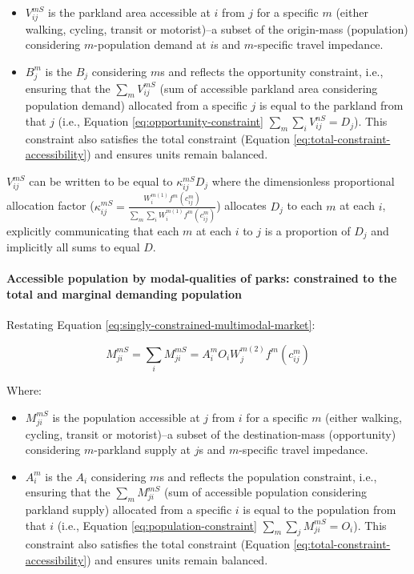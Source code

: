 \documentclass[
11pt, %
oneside, %
english, %
singlespacing, %
]{macthesis} %
\def\tightlist{}
\begin{document}
\begin{itemize}
\tightlist
\item
  \(V^{mS}_{ij}\) is the parkland area accessible at \(i\) from \(j\) for a specific \(m\) (either walking, cycling, transit or motorist)--a subset of the origin-mass (population) considering \(m\)-population demand at \(i\)s and \(m\)-specific travel impedance.
\item
  \(B_j^{m}\) is the \(B_j\) considering \(m\)s and reflects the opportunity constraint, i.e., ensuring that the \(\sum_m V^{mS}_{ij}\) (sum of accessible parkland area considering population demand) allocated from a specific \(j\) is equal to the parkland from that \(j\) (i.e., Equation \ref{eq:opportunity-constraint} \(\sum_m \sum_i V^{nS}_{ij} =  D_j\)). This constraint also satisfies the total constraint (Equation \ref{eq:total-constraint-accessibility}) and ensures units remain balanced.
\end{itemize}

\(V_{ij}^{mS}\) can be written to be equal to \(\kappa_{ij}^{mS} D_j\) where the dimensionless proportional allocation factor (\(\kappa_{ij}^{mS} = \frac{W_i^{m(1)} f^m(c^m_{ij})}{\sum_m\sum_i W_i^{m(1)} f^m(c^m_{ij})}\)) allocates \(D_j\) to each \(m\) at each \(i\), explicitly communicating that each \(m\) at each \(i\) to \(j\) is a proportion of \(D_j\) and implicitly all sums to equal \(D\).

\paragraph{Accessible population by modal-qualities of parks: constrained to the total and marginal demanding population}\label{accessible-population-by-modal-qualities-of-parks-constrained-to-the-total-and-marginal-demanding-population}

Restating Equation \ref{eq:singly-constrained-multimodal-market}:

\begin{equation}
\label{eq:singly-constrained-multimodal-market}
M^{mS}_{ji} = \sum_i M^{mS}_{ji} = A_i^{m} O_i W_j^{m(2)} f^m(c^m_{ij})
\end{equation} 

Where:

\begin{itemize}
\tightlist
\item
  \(M^{mS}_{ji}\) is the population accessible at \(j\) from \(i\) for a specific \(m\) (either walking, cycling, transit or motorist)--a subset of the destination-mass (opportunity) considering \(m\)-parkland supply at \(j\)s and \(m\)-specific travel impedance.
\item
  \(A_i^{m}\) is the \(A_i\) considering \(m\)s and reflects the population constraint, i.e., ensuring that the \(\sum_m M^{mS}_{ji}\) (sum of accessible population considering parkland supply) allocated from a specific \(i\) is equal to the population from that \(i\) (i.e., Equation \ref{eq:population-constraint} \(\sum_m \sum_j M^{mS}_{ji} =  O_i\)). This constraint also satisfies the total constraint (Equation \ref{eq:total-constraint-accessibility}) and ensures units remain balanced.
\end{itemize}
\end{document}
